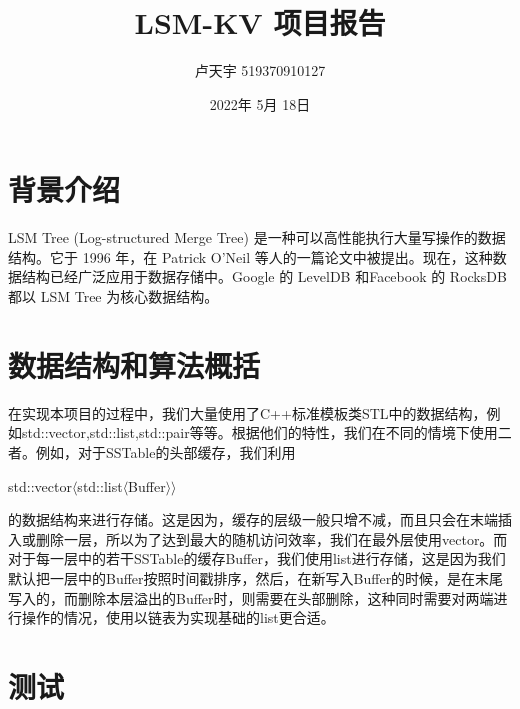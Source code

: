 \documentclass{article}
\title{LSM-KV 项目报告}
\author{卢天宇 519370910127}
\date{2022年 5月 18日}
\begin{document}
\maketitle

\section{背景介绍}

LSM Tree (Log-structured Merge Tree) 是一种可以高性能执行大量写操作的数据结构。它于 1996 年，在 Patrick O'Neil 等人的一篇论文中被提出。现在，这种数据结构已经广泛应用于数据存储中。Google 的 LevelDB 和Facebook 的 RocksDB 都以 LSM Tree 为核心数据结构。




\section{数据结构和算法概括}


在实现本项目的过程中，我们大量使用了C++标准模板类STL中的数据结构，例如std::vector,std::list,std::pair等等。根据他们的特性，我们在不同的情境下使用二者。例如，对于SSTable的头部缓存，我们利用
\begin{center}
	std::vector$\langle$std::list$\langle$Buffer$\rangle$$\rangle$
\end{center}
的数据结构来进行存储。这是因为，缓存的层级一般只增不减，而且只会在末端插入或删除一层，所以为了达到最大的随机访问效率，我们在最外层使用vector。而对于每一层中的若干SSTable的缓存Buffer，我们使用list进行存储，这是因为我们默认把一层中的Buffer按照时间戳排序，然后，在新写入Buffer的时候，是在末尾写入的，而删除本层溢出的Buffer时，则需要在头部删除，这种同时需要对两端进行操作的情况，使用以链表为实现基础的list更合适。



\section{测试}
\end{document}
